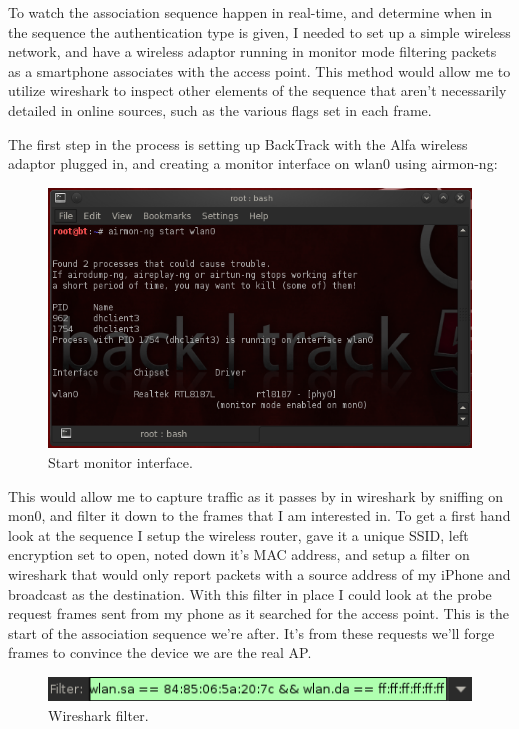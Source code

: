 To watch the association sequence happen in real-time, and determine when in the sequence the authentication type is given, I needed to set up a simple wireless network, and have a wireless adaptor running in monitor mode filtering packets as a smartphone associates with the access point. This method would allow me to utilize wireshark to inspect other elements of the sequence that aren’t necessarily detailed in online sources, such as the various flags set in each frame.

The first step in the process is setting up BackTrack with the Alfa wireless adaptor plugged in, and creating a monitor interface on wlan0 using airmon-ng:

\begin{figure}[h!]
\includegraphics[width=\linewidth]{research/80211/figures/bt1.png}
\caption{Start monitor interface.}
\label{research:80211:bt1}
\end{figure}

This would allow me to capture traffic as it passes by in wireshark by sniffing on mon0, and filter it down to the frames that I am interested in. To get a first hand look at the sequence I setup the wireless router, gave it a unique SSID, left encryption set to open, noted down it’s MAC address, and setup a filter on wireshark that would only report packets with a source address of my iPhone and broadcast as the destination. With this filter in place I could look at the probe request frames sent from my phone as it searched for the access point. This is the start of the association sequence we're after. It's from these requests we'll forge frames to convince the device we are the real AP.

\begin{figure}[h!]
\includegraphics[width=\linewidth]{research/80211/figures/bt2.png}
\caption{Wireshark filter.}
\label{research:80211:bt2}
\end{figure}


